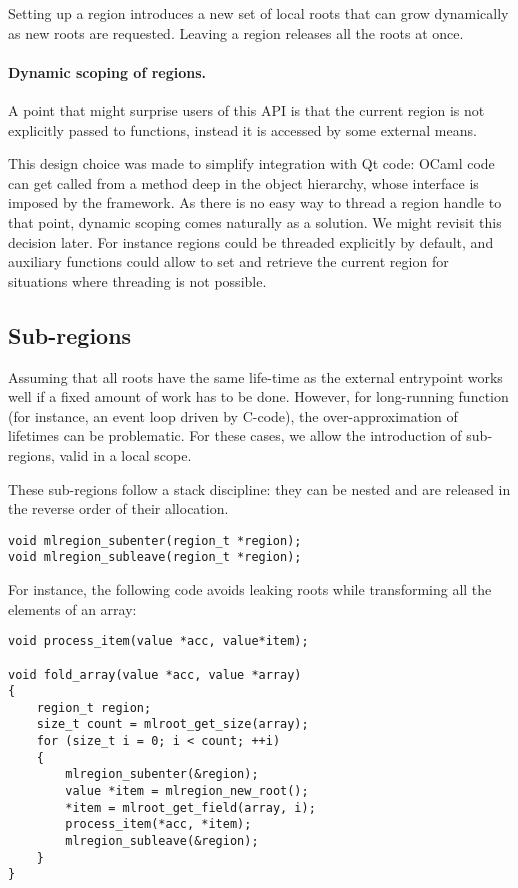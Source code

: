 \documentclass[a4paper]{easychair}
\begin{document}
Setting up a region introduces a new set of local roots that can grow
dynamically as new roots are requested. Leaving a region releases all
the roots at once.

\paragraph{Dynamic scoping of regions.} A point that might surprise users of
this API is that the current region is not explicitly passed to functions,
instead it is accessed by some external means.

This design choice was made to simplify integration with Qt code: OCaml code
can get called from a method deep in the object hierarchy, whose interface is
imposed by the framework. As there is no easy way to thread a region handle to
that point, dynamic scoping comes naturally as a solution. We might revisit this
decision later. For instance regions could be threaded explicitly by default,
and auxiliary functions could allow to set and retrieve the current region for
situations where threading is not possible.

\subsection{Sub-regions}

Assuming that all roots have the same life-time as the external
entrypoint works well if a fixed amount of work has to be done. However,
for long-running function (for instance, an event loop driven by
C-code), the over-approximation of lifetimes can be problematic. For
these cases, we allow the introduction of sub-regions, valid in a local
scope.

These sub-regions follow a stack discipline: they can be nested and are
released in the reverse order of their allocation.
%
\begin{lstlisting}[style=C++]
void mlregion_subenter(region_t *region);
void mlregion_subleave(region_t *region);
\end{lstlisting}

For instance, the following code avoids leaking roots while transforming
all the elements of an array:
%
\begin{lstlisting}[style=C++]
void process_item(value *acc, value*item);

void fold_array(value *acc, value *array)
{
    region_t region;
    size_t count = mlroot_get_size(array);
    for (size_t i = 0; i < count; ++i)
    {
        mlregion_subenter(&region);
        value *item = mlregion_new_root();
        *item = mlroot_get_field(array, i);
        process_item(*acc, *item);
        mlregion_subleave(&region);
    }
}
\end{lstlisting}
\end{document}
